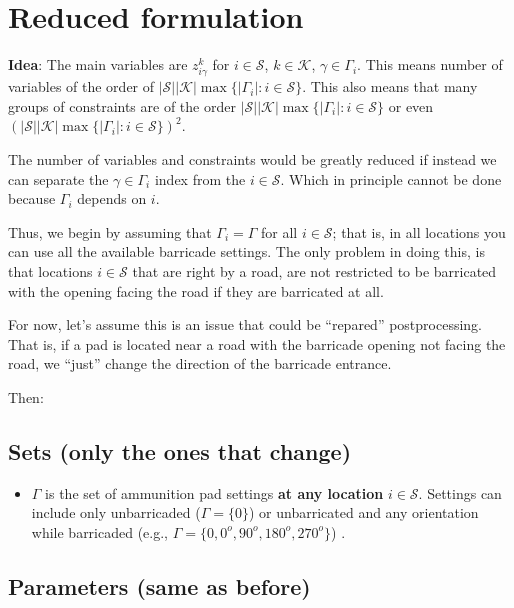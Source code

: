 \documentclass[10pt]{article}
\begin{document}
\section{Reduced formulation}
{\bf Idea}: The main variables are $z^k_{i\gamma}$ for $i \in \mathcal{S}$, $k \in \mathcal{K}$, $\gamma \in \Gamma_i$. This means number of variables of the order of $|\mathcal{S}||\mathcal{K}|\max\{|\Gamma_i|: i \in \mathcal{S}\}$. This also means that many groups of constraints are of the order $|\mathcal{S}||\mathcal{K}|\max\{|\Gamma_i|: i \in \mathcal{S}\}$ or even $(|\mathcal{S}||\mathcal{K}|\max\{|\Gamma_i|: i \in \mathcal{S}\})^2$.

The number of variables and constraints would be greatly reduced if instead we can separate the $\gamma \in \Gamma_i$ index from the $i \in \mathcal{S}$. Which in principle cannot be done because $\Gamma_i$ depends on $i$.

Thus, we begin by assuming that $\Gamma_i = \Gamma$ for all $i \in \mathcal{S}$; that is, in all locations you can use all the available barricade settings. The only problem in doing this, is that locations $i \in \mathcal{S}$ that are right by a road, are not restricted to be barricated with the opening facing the road if they are barricated at all. 

For now, let's assume this is an issue that could be ``repared'' postprocessing. That is, if a pad is located near a road with the barricade opening not facing the road, we ``just'' change the direction of the barricade entrance.

Then:

\subsection{Sets (only the ones that change)}
\begin{itemize}
\item $\Gamma$ is the set of ammunition pad settings {\bf at any location} $ i \in \mathcal{S}$. Settings can include only unbarricaded ($\Gamma = \{0\}$) or unbarricated and any orientation while barricaded (e.g., $\Gamma = \{0, 0^o, 90^o, 180^o, 270^o\}$) . \end{itemize}

\subsection{Parameters (same as before)}
\end{document}
